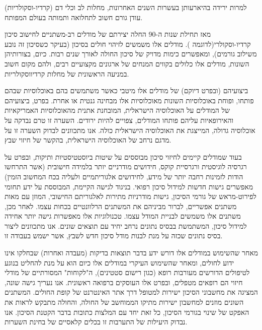 \documentclass[a4paper,12pt]{article}
\begin{document}
	\begin{hebrew}
		למרות ירידה בהיארעותן בעשרות השנים האחרונות,\cite{Koton2014,Vangen-Loenne2017} מחלות לב וכלי דם (קרדיו-וסקולריות) עודן גורם חשוב לתחלואה ותמותה בעולם המפותח\cite{ODonnell2016}.
		
		מאז תחילת שנות ה-90 החלה יצירתם של מודלים רב-משתניים לחישוב סיכון קרדיו-וסקולרי(לדוגמה \cite{Wilson1998,Conroy2003,DAgostino2008}). מודלים אלו משמשים לזיהוי חולים בסיכון (בעיקר כשסיכון זה נובע משילוב גורמים), ומאפשרים כימות מדויק של סיכון החולה לאורך שנים רבות\cite{Goff2014}. כיום, בצורותיהן השונות, מודלים אלו כלולים בקווים המנחים של ארגונים מקצועיים רבים, ולהם מקום חשוב במניעה הראשונית של מחלות קרדיווסקולריות\cite{Graham2007,Goff2014}.
		
		ביצועיהם (ובפרט דיוקם) של מודלים אלו מיטבי כאשר משתמשים בהם באוכלוסיות שבהם פותחו, ופוחת באוכלוסיות השונות מאוכלוסיות אלו מבחינה גנטית או אחרת\cite{DAgostino2001,Bastuji-Garin2002,DeFilippis2015}. בפרט, ביצועיהם של המודלים על האוכלוסיה הישראלית, המובחנת אתנית מהאוכלוסיות האמריקאיות והאירופאיות עליהם פותחו המודלים, צפויים להיות ירודים. השערה זו טרם נבדקה על אוכלוסיה גדולה, המייצגת את האוכלוסיה הישראלית כולה\cite{Lovis2015}. אנו מתכוונים לבדוק השערה זו על מדגם נרחב של האוכלוסיה הישראלית, בהקשר של חיזוי שבץ.
		
		בעוד שמודלים קיימים לחיזוי סיכון מבוססים על שיטות ביוסטטיסטיות ותיקות, ובפרט על רגרסיה לוגיסטית ורגרסיית קוקס, חידושים מודרניים יותר בלמידה חישובית (אשר התרחשו הודות לזמינות רחבה יותר של מידע, לחידושים אלגוריתמיים ולעליה בכח המחשוב הזמין) מאפשרים גישות חדשות למידול סיכון רפואי\cite{Obermeyer2016}. בניגוד לגישה הקיימת, המבוססת על ידע תחומי לפירוט-מראש של גורמי הסיכון, גישות מודרניות מתירות לאלגוריתם החישובי, המוזן עם מאות משתנים אפשריים, לברור מביניהם את המשתנים הרלוונטיים בכחות עצמו\cite{Weng2017}. לאחר מכן, משתנים אלו משמשים לבניית המודל עצמו. טכנולוגיות אלו מאפשרות גישה יותר אחידה למידול סיכון, המשתמשת בבסיס נתונים נרחב יחיד עם תוצאים שונים\cite{Rajkomar2018}. אנו מתכוונים ליצור בסיס נתונים שכזה על מנת לבנות מודל סיכון חדש  לשבץ, אשר ישמש בעבודה זו.
		
		מאחר שהשימוש במודלים אלו דורש ידע בדבר תוצאות בדיקות (מעבדה ואחרות) שבחלקו אינו ידוע לחולים, ומאחר שהשימוש העיקרי במודלים אלו כיום הוא על מנת להחליט בנוגע לטיפולים הדורשים מעורבות רופא (כגון רישום סטטינים), ה"לקוחות" המסורתיים של מודלי חיזוי הם רופאים מטפלים, ובפרט אלו העוסקים ברפואה ראשונית. אנו נעריך גישה שונה, המציגה את מחשבוני הסיכון ישירות למטופל דרך אתר האינטרנט של קופת החולים. המשתנים השונים מוזנים למחשבון ישירות מתיקו הממוחשב של החולה, והחולה מתבקש לראות את האפקט של שינוי בגורמי הסיכון, כל זאת יחד עם המלצות כתובות בדבר הקטנת הסיכון. אנו נבדוק היעילות של התערבות זו בכלים קלאסיים של בחינת השערות.		

	\end{hebrew}
	
\end{document}
